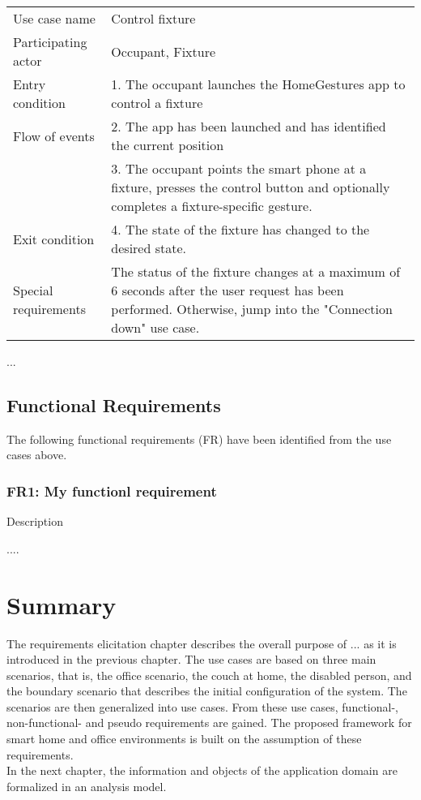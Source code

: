 		\begin{tabular}{ l p{11cm} }
	    \hline                       
  		Use case name & Control fixture \\
  		Participating actor & Occupant, Fixture \\
  		Entry condition & 1. The occupant launches the HomeGestures app to control a fixture \\
  		Flow of events & 2. The app has been launched and has identified the current position \\
  						& 3. The occupant points the smart phone at a fixture, presses the control button and optionally completes a fixture-specific gesture. \\
  		Exit condition & 4. The state of the fixture has changed to the desired state. \\
  		Special requirements & The status of the fixture changes at a maximum of 6 seconds after the user request has been performed. Otherwise, jump into the "Connection down" use case. \\
		\hline
		\end{tabular}
		
		
		...
	    		
		\subsection{Functional Requirements}

		The following functional requirements (FR) have been identified from the use cases above.
		
			\subsubsection{FR1: My functionl requirement}
			Description	

			....

		\section{Summary}
		The requirements elicitation chapter describes the overall purpose of ... as it is introduced in the previous chapter. The use cases are based on three main scenarios, that is, the office scenario, the couch at home, the disabled person, and the boundary scenario that describes the initial configuration of the system. The scenarios are then generalized into use cases. From these use cases, functional-, non-functional- and pseudo requirements are gained. The proposed framework for smart home and office environments is built on the assumption of these requirements. \\
		In the next chapter, the information and objects of the application domain are formalized in an analysis model.
		

